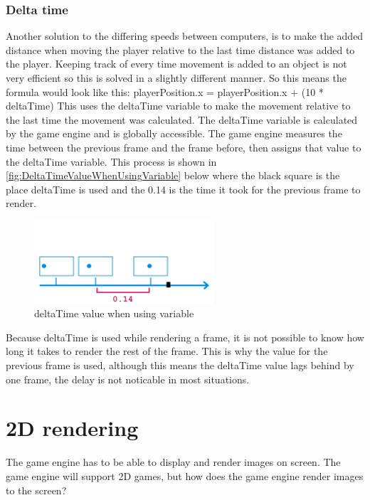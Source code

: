 \documentclass{article} %
\begin{document}
\subsubsection{Delta time}
Another solution to the differing speeds between computers, is to make the added distance when moving the player relative to the last time distance was added to the player.
Keeping track of every time movement is added to an object is not very efficient so this is solved in a slightly different manner.
So this means the formula would look like this:
\newline
playerPosition.x = playerPosition.x + (10 * deltaTime)
\newline
This uses the deltaTime variable to make the movement relative to the last time the movement was calculated.
\newline\newline
The deltaTime variable is calculated by the game engine and is globally accessible.
The game engine measures the time between the previous frame and the frame before, then assigns that value to the deltaTime variable.
This process is shown in \autoref{fig:DeltaTimeValueWhenUsingVariable}  below where the black square is the place deltaTime is used and the 0.14 is the time it took for the previous frame to render.
\begin{figure}[h!]
	\centering
	\includegraphics[width=0.6\textwidth]{used_deltatime_when_using_variable.png}
	\caption{deltaTime value when using variable}
	\label{fig:DeltaTimeValueWhenUsingVariable}
\end{figure}
\newline
Because deltaTime is used while rendering a frame, it is not possible to know how long it takes to render the rest of the frame.
This is why the value for the previous frame is used, although this means the deltaTime value lags behind by one frame, the delay is not noticable in most situations.

\newpage


\section{2D rendering}
The game engine has to be able to display and render images on screen.
The game engine will support 2D games, but how does the game engine render images to the screen?
\end{document}
